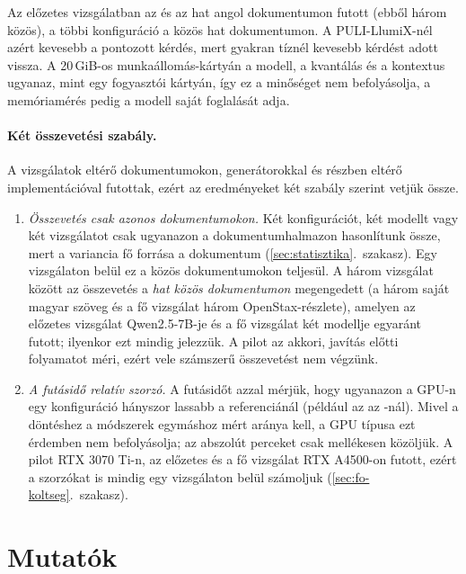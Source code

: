 Az előzetes vizsgálatban az  és az  hat angol dokumentumon futott (ebből három közös), a
többi konfiguráció a közös hat dokumentumon. A PULI-LlumiX-nél azért kevesebb a pontozott kérdés, mert
gyakran tíznél kevesebb kérdést adott vissza. A 20\,GiB-os munkaállomás-kártyán a modell, a kvantálás és a
kontextus ugyanaz, mint egy fogyasztói kártyán, így ez a minőséget nem befolyásolja, a memóriamérés pedig a
modell saját foglalását adja.

\paragraph{Két összevetési szabály.} A vizsgálatok eltérő dokumentumokon, generátorokkal és részben eltérő
implementációval futottak, ezért az eredményeket két szabály szerint vetjük össze.
\begin{enumerate}[label=(\arabic*)]
\item \emph{Összevetés csak azonos dokumentumokon.} Két konfigurációt, két modellt vagy két vizsgálatot
csak ugyanazon a dokumentumhalmazon hasonlítunk össze, mert a variancia fő forrása a dokumentum
(\ref{sec:statisztika}.~szakasz). Egy vizsgálaton belül ez a közös dokumentumokon teljesül. A három
vizsgálat között az összevetés a \emph{hat közös dokumentumon} megengedett (a három saját magyar szöveg és
a fő vizsgálat három OpenStax-részlete), amelyen az előzetes vizsgálat Qwen2.5-7B-je és a fő vizsgálat két
modellje egyaránt futott; ilyenkor ezt mindig jelezzük. A pilot az akkori, javítás előtti folyamatot méri,
ezért vele számszerű összevetést nem végzünk.
\item \emph{A futásidő relatív szorzó.} A futásidőt azzal mérjük, hogy ugyanazon a GPU-n egy konfiguráció
hányszor lassabb a referenciánál (például az  az -nál). Mivel a döntéshez a módszerek
egymáshoz mért aránya kell, a GPU típusa ezt érdemben nem befolyásolja; az abszolút perceket csak
mellékesen közöljük. A pilot RTX 3070 Ti-n, az előzetes és a fő vizsgálat RTX A4500-on futott, ezért a
szorzókat is mindig egy vizsgálaton belül számoljuk (\ref{sec:fo-koltseg}.~szakasz).
\end{enumerate}

\section{Mutatók}
\label{sec:mutatok}

